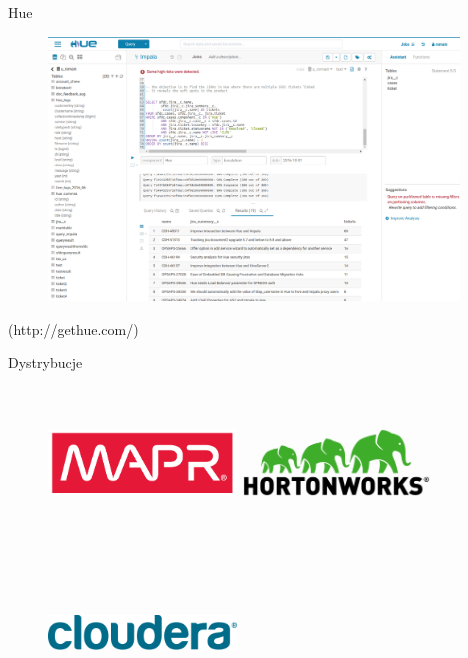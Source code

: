 \documentclass{beamer}
\begin{document}
\begin{frame}{Hue}
	\begin{figure}
		\includegraphics[width=\textwidth,height=7cm,keepaspectratio=true]{hue}
	\end{figure}
	\begin{center}
		{\tiny (http://gethue.com/)}
	\end{center}
\end{frame}
\begin{frame}{Dystrybucje}
	\begin{multicols}{2}
		\begin{figure}
			\includegraphics[width=5cm,height=4cm,keepaspectratio=true]{distributions/mapr}
			\includegraphics[width=5cm,height=4cm,keepaspectratio=true]{distributions/hortonworks}
		\end{figure}
	\end{multicols}
	\begin{figure}
		\includegraphics[width=5cm,height=4cm,keepaspectratio=true]{distributions/cloudera}
	\end{figure}
\end{frame}
\end{document}

